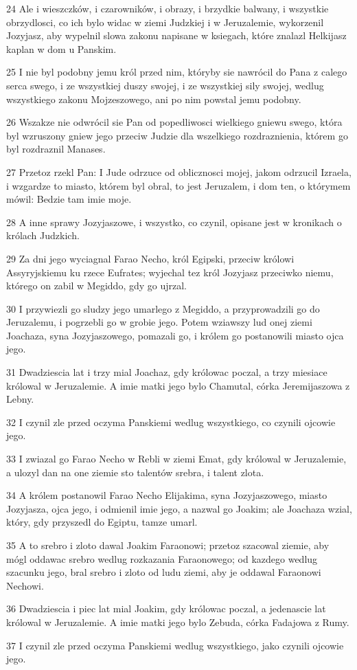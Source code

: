 \par 24 Ale i wieszczków, i czarowników, i obrazy, i brzydkie balwany, i wszystkie obrzydlosci, co ich bylo widac w ziemi Judzkiej i w Jeruzalemie, wykorzenil Jozyjasz, aby wypelnil slowa zakonu napisane w ksiegach, które znalazl Helkijasz kaplan w dom u Panskim.
\par 25 I nie byl podobny jemu król przed nim, któryby sie nawrócil do Pana z calego serca swego, i ze wszystkiej duszy swojej, i ze wszystkiej sily swojej, wedlug wszystkiego zakonu Mojzeszowego, ani po nim powstal jemu podobny.
\par 26 Wszakze nie odwrócil sie Pan od popedliwosci wielkiego gniewu swego, która byl wzruszony gniew jego przeciw Judzie dla wszelkiego rozdraznienia, którem go byl rozdraznil Manases.
\par 27 Przetoz rzekl Pan: I Jude odrzuce od oblicznosci mojej, jakom odrzucil Izraela, i wzgardze to miasto, którem byl obral, to jest Jeruzalem, i dom ten, o którymem mówil: Bedzie tam imie moje.
\par 28 A inne sprawy Jozyjaszowe, i wszystko, co czynil, opisane jest w kronikach o królach Judzkich.
\par 29 Za dni jego wyciagnal Farao Necho, król Egipski, przeciw królowi Assyryjskiemu ku rzece Eufrates; wyjechal tez król Jozyjasz przeciwko niemu, którego on zabil w Megiddo, gdy go ujrzal.
\par 30 I przywiezli go sludzy jego umarlego z Megiddo, a przyprowadzili go do Jeruzalemu, i pogrzebli go w grobie jego. Potem wziawszy lud onej ziemi Joachaza, syna Jozyjaszowego, pomazali go, i królem go postanowili miasto ojca jego.
\par 31 Dwadziescia lat i trzy mial Joachaz, gdy królowac poczal, a trzy miesiace królowal w Jeruzalemie. A imie matki jego bylo Chamutal, córka Jeremijaszowa z Lebny.
\par 32 I czynil zle przed oczyma Panskiemi wedlug wszystkiego, co czynili ojcowie jego.
\par 33 I zwiazal go Farao Necho w Rebli w ziemi Emat, gdy królowal w Jeruzalemie, a ulozyl dan na one ziemie sto talentów srebra, i talent zlota.
\par 34 A królem postanowil Farao Necho Elijakima, syna Jozyjaszowego, miasto Jozyjasza, ojca jego, i odmienil imie jego, a nazwal go Joakim; ale Joachaza wzial, który, gdy przyszedl do Egiptu, tamze umarl.
\par 35 A to srebro i zloto dawal Joakim Faraonowi; przetoz szacowal ziemie, aby mógl oddawac srebro wedlug rozkazania Faraonowego; od kazdego wedlug szacunku jego, bral srebro i zloto od ludu ziemi, aby je oddawal Faraonowi Nechowi.
\par 36 Dwadziescia i piec lat mial Joakim, gdy królowac poczal, a jedenascie lat królowal w Jeruzalemie. A imie matki jego bylo Zebuda, córka Fadajowa z Rumy.
\par 37 I czynil zle przed oczyma Panskiemi wedlug wszystkiego, jako czynili ojcowie jego.

